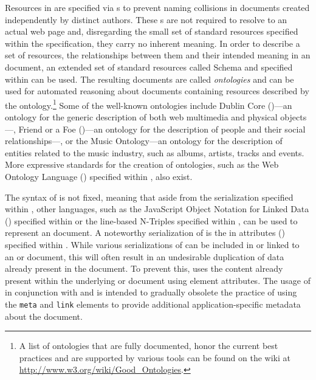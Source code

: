 \documentclass{book}
\begin{document}
        Resources in  are specified via s to prevent
        naming collisions in  documents created independently by
        distinct authors. These s are not required to resolve to an
        actual web page and, disregarding the small set of standard resources
        specified within the  specification, they carry no inherent
        meaning.  In order to describe a set of resources, the relationships
        between them and their intended meaning in an  document, an
        extended set of standard resources called  Schema and
        specified within \cite{brickley04} can be used. The resulting documents
        are called \emph{ontologies} and can be used for automated reasoning
        about  documents containing resources described by the
        ontology.\footnote{
          A list of ontologies that are fully documented, honor the current best
          practices and are supported by various tools can be found on the
           wiki at \url{http://www.w3.org/wiki/Good_Ontologies}.
        } Some of the well-known ontologies include Dublin
        Core ()---an ontology for the generic description of both
        web multimedia and physical objects---, Friend or a Foe
        ()---an ontology for the description of people and their
        social relationships---, or the Music Ontology---an ontology for the
        description of entities related to the music industry, such as albums,
        artists, tracks and events. More expressive standards for the creation
        of ontologies, such as the Web Ontology Language ()
        specified within \cite{mcguinness04}, also exist.

        The syntax of  is not fixed, meaning that aside from the
         serialization specified within \cite{lassira99}, other
        languages, such as the JavaScript Object Notation for Linked Data
        () specified within \cite{sporny14} or the line-based
        N-Triples specified within \cite{beckett14}, can be used to represent an
         document. A noteworthy serialization of  is
        the  in attributes () specified within
        \cite{adida08}. While various serializations of  can be
        included in or linked to an  or  document,
        this will often result in an undesirable duplication of data already
        present in the document. To prevent this,  uses the
        content already present within the underlying  or
         document using element attributes. The usage of
         in conjunction with  and  is
        intended to gradually obsolete the practice of using the \texttt{meta}
        and \texttt{link} elements to provide additional application-specific
        metadata about the document.
\end{document}
